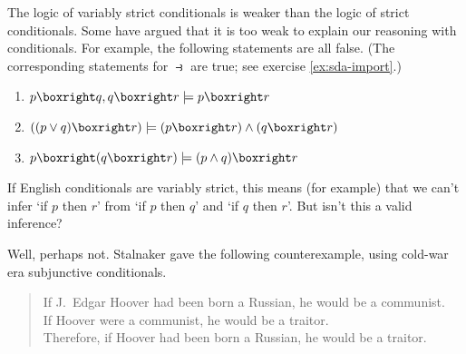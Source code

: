 The logic of variably strict conditionals is weaker than the logic of strict
conditionals. Some have argued that it is too weak to explain our reasoning with
conditionals. For example, the following statements are all false. (The
corresponding statements for $\strictif$ are true; see exercise
\ref{ex:sda-import}.)
\begin{enumerate}[leftmargin=10mm]
  \itemsep-1mm
\item $p \boxright q, q \boxright r \models p \boxright r$
\item $((p \lor q) \boxright r) \models (p \boxright r) \land (q \boxright r)$
\item $p \boxright (q \boxright r) \models (p \land q) \boxright r$
\end{enumerate}
If English conditionals are variably strict, this means (for example) that we can't 
infer `if $p$ then $r$' from `if $p$ then $q$' and `if $q$ then $r$'. But isn't
this a valid inference?

Well, perhaps not. Stalnaker gave the following counterexample, using cold-war
era subjunctive conditionals.
\begin{quote}
  If J.\ Edgar Hoover had been born a Russian, he would be a communist.\\
  If Hoover were a communist, he would be a traitor.\\
  Therefore, if Hoover had been born a Russian, he would be a traitor.
\end{quote}



